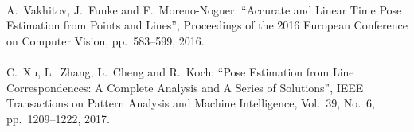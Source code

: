 \begin{mythebibliography}{}



\leavevmode \\A.~Vakhitov, J.~Funke and F.~Moreno-Noguer:
\newblock ``Accurate and Linear Time Pose Estimation from Points and Lines'',
\newblock Proceedings of the 2016 European Conference on Computer Vision, pp.~583--599, 2016.
\\



\leavevmode \\C.~Xu, L.~Zhang, L.~Cheng and R.~Koch:
\newblock ``Pose Estimation from Line Correspondences: A Complete Analysis and A Series of Solutions'',
\newblock IEEE Transactions on Pattern Analysis and Machine Intelligence, Vol.~39, No.~6, pp.~1209--1222, 2017.
\\


\end{mythebibliography}
